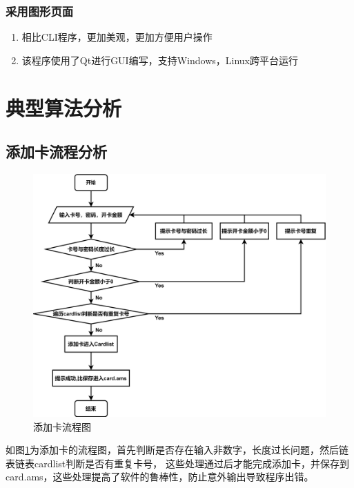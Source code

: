\documentclass{article}
\begin{document}
    \subsubsection{采用图形页面}
    \begin{enumerate}
        \item 相比CLI程序，更加美观，更加方便用户操作
        \item 该程序使用了Qt进行GUI编写，支持Windows，Linux跨平台运行
    \end{enumerate}
    \section{典型算法分析}
    \subsection{添加卡流程分析}
    \begin{figure}[h]
        \centering
        \includegraphics[scale=0.14]{figure/add_pic.png}
        \caption{添加卡流程图}
        \label{add_pic}
    \end{figure}
    如图\ref{add_pic}为添加卡的流程图，首先判断是否存在输入非数字，长度过长问题，然后链表链表cardlist判断是否有重复卡号，
    这些处理通过后才能完成添加卡，并保存到card.ams，这些处理提高了软件的鲁棒性，防止意外输出导致程序出错。
\end{document}
